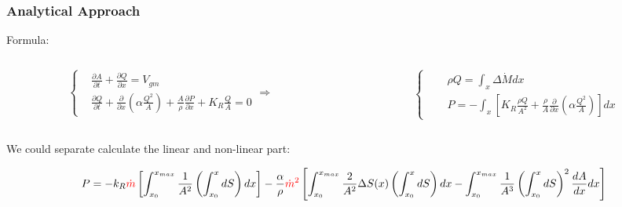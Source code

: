 \documentclass{beamer}
\begin{document}
\begin{frame}
    \fontsize{8pt}{10pt}\selectfont
    \frametitle{Analytical Approach }


    Formula:

    \begin{columns}
        \begin{column}{0.6\textwidth}
            \begin{equation*}
                \left\{
                \begin{aligned}
                & \frac{\partial A}{\partial t} + \frac{\partial Q}{\partial x} = V_{gm} \\
                & \frac{\partial Q}{\partial t} + \frac{\partial}{\partial x} \left( \alpha \frac{Q^2}{A} \right) + \frac{A}{\rho} \frac{\partial P}{\partial x} + K_R \frac{Q}{A} = 0
                \end{aligned}
                \right.
                \Rightarrow
            \end{equation*}
            
        \end{column}
        \begin{column}{0.5\textwidth}
            \begin{equation*}
            \left\{
            \begin{aligned}
            & \quad \rho Q = \int_{x} \Delta \dot{M} dx\\
            & \quad P = - \int_{x} [K_R \frac{\rho Q}{A^2} + \frac{\rho}{A}\frac{\partial}{\partial x}(\alpha\frac{Q^2}{A})] dx
            \end{aligned}
            \right.
            \end{equation*}
            
        \end{column}
    \end{columns}

    We could separate calculate the linear and non-linear part:


            {\tiny
            \begin{equation}
                P = -k_R \textcolor{red}{\dot{m}}
                \left[
                \int_{x_0}^{x_{max}}
                \frac{1}{A^2} 
                \left(
                \int_{x_0}^x
                dS 
                \right) 
                dx 
                \right]
                 - \frac{\alpha}{\rho}  \textcolor{red}{{\dot{m}^2}}
                \left[  
                \int_{x_0}^{x_{max}} 
                \frac{2}{A^2}  \Delta S(x)
                \left(
                \int_{x_0}^x
                dS
                \right) 
                dx 
                -  
                \int_{x_0}^{x_{max}}
                \frac{1}{A^3}
                \left(
                \int_{x_0}^x
                dS
                \right) ^2
                \frac{dA}{dx} 
                dx
                \right]
                \end{equation}
            }      
                

\end{frame}
\end{document}

